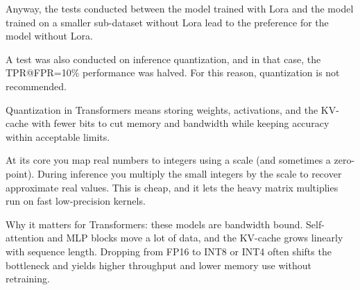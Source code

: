 Anyway, the tests conducted between the model trained with 
Lora and the model trained on a smaller sub-dataset without 
Lora lead to the preference for the model without Lora.

A test was also conducted on inference quantization, and in that 
case, the TPR@FPR=10\% performance was halved. For this 
reason, quantization is not recommended.

Quantization in Transformers means storing weights, activations, 
and the KV-cache with fewer bits to cut memory and bandwidth while 
keeping accuracy within acceptable limits.

At its core you map real numbers to integers using a scale 
(and sometimes a zero-point). During inference you multiply 
the small integers by the scale to recover approximate real 
values. This is cheap, and it lets the heavy matrix multiplies 
run on fast low-precision kernels.

Why it matters for Transformers: these models are bandwidth 
bound. Self-attention and MLP blocks move a lot of data, and 
the KV-cache grows linearly with sequence length. Dropping 
from FP16 to INT8 or INT4 often shifts the bottleneck and 
yields higher throughput and lower memory use without retraining.

